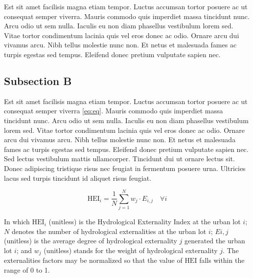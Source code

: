 \documentclass[12pt]{article}
\begin{document}
\par Est sit amet facilisis magna etiam tempor. Luctus accumsan tortor posuere ac ut consequat semper viverra. Mauris commodo quis imperdiet massa tincidunt nunc. Arcu odio ut sem nulla. Iaculis eu non diam phasellus vestibulum lorem sed. Vitae tortor condimentum lacinia quis vel eros donec ac odio. Ornare arcu dui vivamus arcu. Nibh tellus molestie nunc non. Et netus et malesuada fames ac turpis egestas sed tempus. Eleifend donec pretium vulputate sapien nec.

\subsection{Subsection B} \label{sec:subb}

\par Est sit amet facilisis magna etiam tempor. Luctus accumsan tortor posuere ac ut consequat semper viverra \eqref{eq:eq}. Mauris commodo quis imperdiet massa tincidunt nunc. Arcu odio ut sem nulla. Iaculis eu non diam phasellus vestibulum lorem sed. Vitae tortor condimentum lacinia quis vel eros donec ac odio. Ornare arcu dui vivamus arcu. Nibh tellus molestie nunc non. Et netus et malesuada fames ac turpis egestas sed tempus. Eleifend donec pretium vulputate sapien nec. Sed lectus vestibulum mattis ullamcorper. Tincidunt dui ut ornare lectus sit. Donec adipiscing tristique risus nec feugiat in fermentum posuere urna. Ultricies lacus sed turpis tincidunt id aliquet risus feugiat.
\begin{linenomath*}
\begin{equation}
	\label{eq:eq}
	\text{HEI}_{i} =  \frac{1}{N} \sum_{j=1}^{N} w_{j} \cdot E_{i, j} \quad \forall i 
\end{equation}
\end{linenomath*}
In which $\text{HEI}_{i}$ (unitless) is the Hydrological Externality Index at the urban lot $i$; $N$ denotes the number of hydrological externalities at the urban lot $i$; $E{i,j}$ (unitless) is the average degree of hydrological externality $j$ generated the urban lot $i$; and $w_{j}$ (unitless) stands for the weight of hydrological externality $j$. The externalities factors may be normalized so that the value of $\text{HEI}$ falls within the range of 0 to 1.
\end{document}
